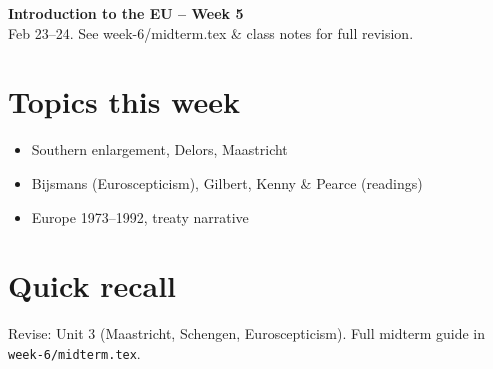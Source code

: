 \documentclass[10pt,a4paper]{article}
\begin{document}
\begin{center}
{\large\bfseries\color{eublue} Introduction to the EU -- Week 5}\\[0.2em]
\footnotesize Feb 23--24. See week-6/midterm.tex \& class notes for full revision.
\end{center}\vspace{0.5em}

\section*{\color{eublue}Topics this week}
\begin{itemize}
\item Southern enlargement, Delors, Maastricht
\item Bijsmans (Euroscepticism), Gilbert, Kenny \& Pearce (readings)
\item Europe 1973--1992, treaty narrative
\end{itemize}

\section*{Quick recall}
Revise: Unit 3 (Maastricht, Schengen, Euroscepticism). Full midterm guide in \texttt{week-6/midterm.tex}.
\end{document}
